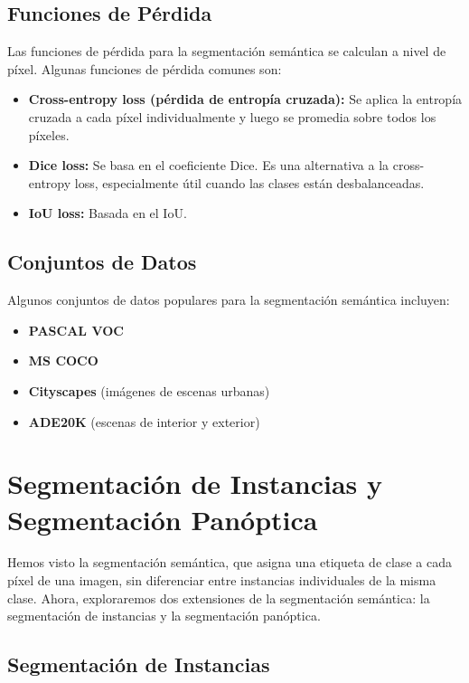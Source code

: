 \documentclass{article}
\begin{document}
\subsection{Funciones de Pérdida}

Las funciones de pérdida para la segmentación semántica se calculan a nivel de píxel. Algunas funciones de pérdida comunes son:

\begin{itemize}
    \item \textbf{Cross-entropy loss (pérdida de entropía cruzada):}  Se aplica la entropía cruzada a cada píxel individualmente y luego se promedia sobre todos los píxeles.
    \item \textbf{Dice loss:}  Se basa en el coeficiente Dice.  Es una alternativa a la cross-entropy loss, especialmente útil cuando las clases están desbalanceadas.
    \item \textbf{IoU loss:} Basada en el IoU.
\end{itemize}

\subsection{Conjuntos de Datos}

Algunos conjuntos de datos populares para la segmentación semántica incluyen:

\begin{itemize}
    \item \textbf{PASCAL VOC}
    \item \textbf{MS COCO}
    \item \textbf{Cityscapes} (imágenes de escenas urbanas)
    \item \textbf{ADE20K} (escenas de interior y exterior)
\end{itemize}

\section{Segmentación de Instancias y Segmentación Panóptica}

Hemos visto la segmentación semántica, que asigna una etiqueta de clase a cada píxel de una imagen, sin diferenciar entre instancias individuales de la misma clase.  Ahora, exploraremos dos extensiones de la segmentación semántica: la segmentación de instancias y la segmentación panóptica.

\subsection{Segmentación de Instancias}
\end{document}
